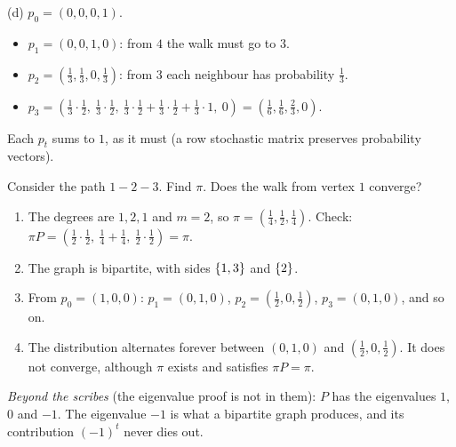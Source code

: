 \begin{exercisebox}
\begin{wsolution}
    (d) $p_0 = (0, 0, 0, 1)$.
    \begin{itemize}
        \item $p_1 = (0, 0, 1, 0)$: from $4$ the walk must go to $3$.
        \item $p_2 = \left(\frac{1}{3}, \frac{1}{3}, 0, \frac{1}{3}\right)$: from $3$ each
              neighbour has probability $\frac{1}{3}$.
        \item $p_3 = \left(\frac{1}{3} \cdot \frac{1}{2},\ \frac{1}{3} \cdot \frac{1}{2},\
                  \frac{1}{3} \cdot \frac{1}{2} + \frac{1}{3} \cdot \frac{1}{2} + \frac{1}{3} \cdot 1,\ 0\right)
                  = \left(\frac{1}{6}, \frac{1}{6}, \frac{2}{3}, 0\right)$.
    \end{itemize}
    Each $p_t$ sums to $1$, as it must (a row stochastic matrix preserves probability vectors).
\end{wsolution}
\end{exercisebox}

\begin{exercisebox}
\begin{pproblem}\label{pp:path}
    Consider the path $1 - 2 - 3$. Find $\pi$. Does the walk from vertex $1$ converge?
\end{pproblem}
\tcblower
\begin{wsolution}
    \leavevmode
    \begin{enumerate}
        \item The degrees are $1, 2, 1$ and $m = 2$, so
              $\pi = \left(\frac{1}{4}, \frac{1}{2}, \frac{1}{4}\right)$. Check:
              $\pi P = \left(\frac{1}{2} \cdot \frac{1}{2},\ \frac{1}{4} + \frac{1}{4},\ \frac{1}{2} \cdot \frac{1}{2}\right) = \pi$.
        \item The graph is bipartite, with sides $\left\lbrace1, 3\right\rbrace$ and $\left\lbrace2\right\rbrace$.
        \item From $p_0 = (1, 0, 0)$: $p_1 = (0, 1, 0)$,
              $p_2 = \left(\frac{1}{2}, 0, \frac{1}{2}\right)$, $p_3 = (0, 1, 0)$, and so on.
        \item The distribution alternates forever between $(0, 1, 0)$ and
              $\left(\frac{1}{2}, 0, \frac{1}{2}\right)$. It does not converge, although $\pi$
              exists and satisfies $\pi P = \pi$.
    \end{enumerate}
    \emph{Beyond the scribes} (the eigenvalue proof is not in them): $P$ has the eigenvalues $1$,
    $0$ and $-1$. The eigenvalue $-1$ is what a
    bipartite graph produces, and its contribution $(-1)^t$ never dies out.
\end{wsolution}
\end{exercisebox}

